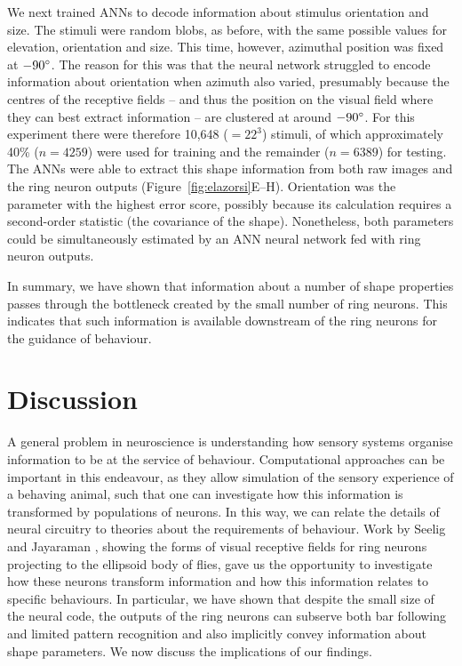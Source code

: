 We next trained ANNs to decode information about stimulus orientation and size.
The stimuli were random blobs, as before, with the same possible values for elevation, orientation and size.
This time, however, azimuthal position was fixed at $-90\degree$.
The reason for this was that the neural network struggled to encode information about orientation when azimuth also varied, presumably because the centres of the receptive fields -- and thus the position on the visual field where they can best extract information -- are clustered at around $-90\degree$.
For this experiment there were therefore 10,648 ($=22^3$) stimuli, of which approximately 40\% ($n=4259$) were used for training and the remainder ($n=6389$) for testing.
The ANNs were able to extract this shape information from both raw images and the ring neuron outputs (Figure~\ref{fig:elazorsi}E--H).
Orientation was the parameter with the highest error score, possibly because its calculation requires a second-order statistic (the covariance of the shape).
Nonetheless, both parameters could be simultaneously estimated by an ANN neural network fed with ring neuron outputs.

In summary, we have shown that information about a number of shape properties passes through the bottleneck created by the small number of ring neurons. This indicates that such information is available downstream of the ring neurons for the guidance of behaviour.

\section*{Discussion}
A general problem in neuroscience is understanding how sensory systems organise information to be at the service of behaviour. Computational approaches can be important in this endeavour, as they allow simulation of the sensory experience of a behaving animal, such that one can investigate how this information is transformed by populations of neurons. In this way, we can relate the details of neural circuitry to theories about the requirements of behaviour. Work by Seelig and Jayaraman \cite{Seelig2013}, showing the forms of visual receptive fields for ring neurons projecting to the ellipsoid body of flies, gave us the opportunity to investigate how these neurons transform information and how this information relates to specific behaviours. In particular, we have shown that despite the small size of the neural code, the outputs of the ring neurons can subserve both bar following and limited pattern recognition and also implicitly convey information about shape parameters. We now discuss the implications of our findings.


